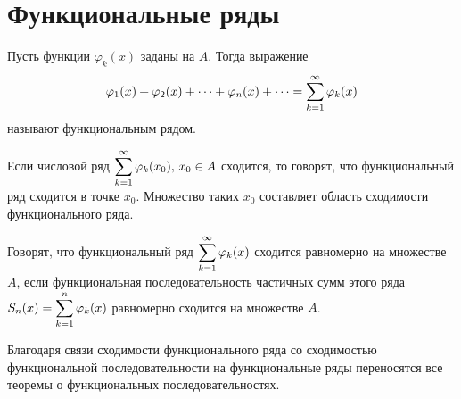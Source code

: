 \section{Функциональные ряды}

\begin{definition}
    Пусть функции $\varphi_k(x)$ заданы на $A$. Тогда выражение
    \[
        \varphi_1(x) + \varphi_2(x) + \dots + \varphi_n(x) + \dots = 
        \displaystyle\sum_{k=1}^\infty \varphi_k(x)
    \]
    называют функциональным рядом.
\end{definition}

\begin{definition}
    Если числовой ряд $\displaystyle\sum_{k=1}^\infty \varphi_k(x_0), \, x_0 \in A$ сходится, то
    говорят, что функциональный ряд сходится в точке $x_0$. Множество таких
    $x_0$ составляет область сходимости функционального ряда.
\end{definition}

\begin{definition}
    Говорят, что функциональный ряд $\displaystyle\sum_{k=1}^\infty \varphi_k(x)$ сходится равномерно
    на множестве $A$, если функциональная последовательность частичных сумм
    этого ряда $S_n(x) = \displaystyle\sum_{k=1}^n \varphi_k(x)$ равномерно сходится
    на множестве $A$.
\end{definition}

\begin{remark}
    Благодаря связи сходимости функционального ряда со сходимостью 
    функциональной последовательности на функциональные ряды переносятся все
    теоремы о функциональных последовательностях.
\end{remark}

